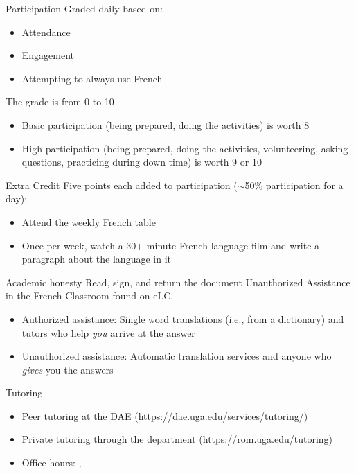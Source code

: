 \begin{frame}{Participation}
  Graded daily based on:
  \begin{itemize}
    \item Attendance
    \item Engagement
    \item Attempting to always use French
  \end{itemize}
  The grade is from 0 to 10
  \begin{itemize}
    \item Basic participation (being prepared, doing the activities) is worth \alert{8}
    \item High participation (being prepared, doing the activities, volunteering, asking questions, practicing during down time) is worth \alert{9} or \alert{10}
  \end{itemize}
\end{frame}

\begin{frame}{Extra Credit}
  Five points each added to participation ($\sim$50\% participation for a day):
  \begin{itemize}
    \item Attend the weekly French table
    \item Once per week, watch a 30+ minute French-language film and write a paragraph about the language in it
  \end{itemize}
\end{frame}

\begin{frame}{Academic honesty}
  Read, sign, and return the document Unauthorized Assistance in the French Classroom found on eLC.
  \begin{itemize}
    \item Authorized assistance: Single word translations (i.e., from a dictionary) and tutors who help \emph{you} arrive at the answer
    \item Unauthorized assistance: Automatic translation services and anyone who \emph{gives} you the answers
  \end{itemize}
\end{frame}

\begin{frame}{Tutoring}
  \begin{itemize}
    \item Peer tutoring at the DAE (\url{https://dae.uga.edu/services/tutoring/})
    \item Private tutoring through the department (\url{https://rom.uga.edu/tutoring})
    \item Office hours: , 
  \end{itemize}
\end{frame}